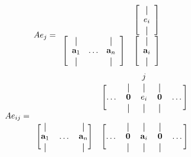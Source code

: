 \documentclass[main.tex]{subfiles}
\begin{document}
\begin{enumerate}[label=1.\arabic*]
\begin{itemize}
\[
  Ae_j =
  \begin{array}{cc}
                                            & \left[\begin{array}{c}
        \vertbar \\
        e_i      \\
        \vertbar
      \end{array}\right] \\
    \left[\begin{array}{ccc}
        \vertbar     &        & \vertbar     \\
        \mathbf{a}_1 & \ldots & \mathbf{a}_n \\
        \vertbar     &        & \vertbar     \\
      \end{array}\right] & \left[\begin{array}{cc} \vertbar \\ \mathbf{a}_i \\ \vertbar \end{array}\right]
  \end{array}
\]
\[
  Ae_{ij} = \begin{array}{cc}
  & \begin{blockarray}{ccccc}
    &  & j & \\
    \begin{block}{[ccccc]}
      & \vertbar & \vertbar & \vertbar & \\
      \ldots & \mathbf{0} & e_i & \mathbf{0} & \ldots \\
      & \vertbar & \vertbar & \vertbar & \\
    \end{block}
  \end{blockarray} \\
  \begin{blockarray}{ccc}\begin{block}{[ccc]} %
      \vertbar & & \vertbar \\
      \mathbf{a}_1 & \ldots & \mathbf{a}_n \\
      \vertbar & & \vertbar \\
    \end{block}\end{blockarray} &
  \begin{blockarray}{ccccc} %
  \begin{block}{[ccccc]}
  & \vertbar & \vertbar & \vertbar & \\
  \ldots & \mathbf{0} & \mathbf{a}_i & \mathbf{0} & \ldots \\
  & \vertbar & \vertbar & \vertbar & \\
  \end{blockarray}
  \end{array}
\]


\end{itemize}
\end{enumerate}
\end{document}
